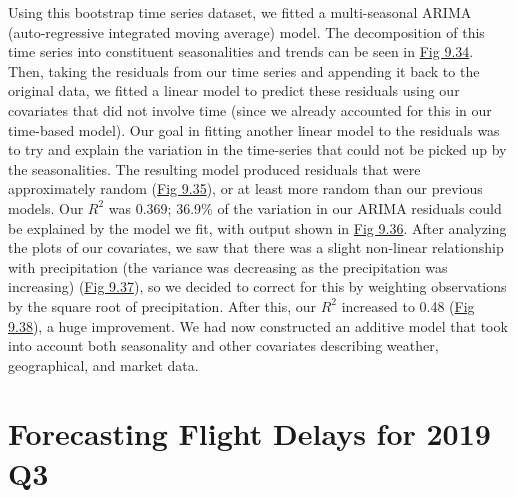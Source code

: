 \documentclass[12pt, a4paper, openany]{book}
\newcommand\tab[1][1cm]{\hspace*{#1}}
\begin{document}
	\tab Using this bootstrap time series dataset, we fitted a multi-seasonal ARIMA (auto-regressive integrated moving average) model. The decomposition of this time series into constituent seasonalities and trends can be seen in \underline{Fig 9.34}. Then, taking the residuals from our time series and appending it back to the original data, we fitted a linear model to predict these residuals using our covariates that did not involve time (since we already accounted for this in our time-based model). Our goal in fitting another linear model to the residuals was to try and explain the variation in the time-series that could not be picked up by the seasonalities. The resulting model produced residuals that were approximately random (\underline{Fig 9.35}), or at least more random than our previous models. Our \textit{$R^2$} was 0.369; 36.9\% of the variation in our ARIMA residuals could be explained by the model we fit, with output shown in \underline{Fig 9.36}. After analyzing the plots of our covariates, we saw that there was a slight non-linear relationship with precipitation (the variance was decreasing as the precipitation was increasing) (\underline{Fig 9.37}), so we decided to correct for this by weighting observations by the square root of precipitation. After this, our \textit{$R^2$} increased to 0.48 (\underline{Fig 9.38}), a huge improvement. We had now constructed an additive model that took into account both seasonality and other covariates describing weather, geographical, and market data.\\


	
\chapter{Forecasting Flight Delays for 2019 Q3}
\end{document}
